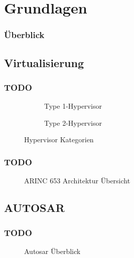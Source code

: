 \documentclass[draft]{beamer}
\newcommand{\inputImage}[1]{}
\begin{document}
\section{Grundlagen}
\label{sec:grundlagen}

\begin{frame}
\frametitle{Überblick}

\end{frame}




\subsection{Virtualisierung}
\begin{frame}
\frametitle{TODO}
    \begin{figure}
        \centering
        \begin{subfigure}[b]{0.49\textwidth}
            \centering
            \inputImage{virt_type1.dia}
            \caption{Type 1-Hypervisor}
            \label{fig:hypervisor_type1}
        \end{subfigure}
        \begin{subfigure}[b]{0.49\textwidth}
            \centering
            \inputImage{virt_type2.dia}
            \caption{Type 2-Hypervisor}
            \label{fig:hypervisor_type2}
        \end{subfigure}
        \caption{Hypervisor Kategorien}
        \label{fig:hypervisor}
    \end{figure}
\end{frame}

\begin{frame}
\frametitle{TODO}
    \begin{figure}[ht]
        \centering
        \inputImage{arinc653.dia}
        \caption[ARINC 653 Architektur Übersicht]{ARINC 653 Architektur Übersicht\cite{arinc653_wr}}
        \label{fig:arinc_653}
    \end{figure}
\end{frame}





\subsection{AUTOSAR}
\begin{frame}
\frametitle{TODO}
    \begin{figure}[p]
        \centering
        \resizebox{\linewidth}{!}{\inputImage{autosar_overview.dia}}
        \caption{Autosar Überblick}
        \label{fig:autosar_overview}
    \end{figure}
\end{frame}
\end{document}
